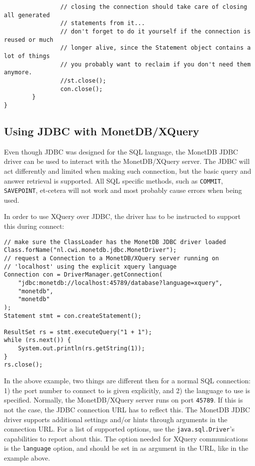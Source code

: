 \documentclass{article}
\begin{document}
\begin{verbatim}
                // closing the connection should take care of closing all generated
                // statements from it...
                // don't forget to do it yourself if the connection is reused or much
                // longer alive, since the Statement object contains a lot of things
                // you probably want to reclaim if you don't need them anymore.
                //st.close();
                con.close();
        }
}
\end{verbatim}

\subsection{Using JDBC with MonetDB/XQuery}
Even though JDBC was designed for the SQL language, the MonetDB JDBC
driver can be used to interact with the MonetDB/XQuery server.  The JDBC
will act differently and limited when making such connection, but the
basic query and answer retrieval is supported.  All SQL specific
methods, such as \texttt{COMMIT}, \texttt{SAVEPOINT}, et-cetera will not
work and most probably cause errors when being used.

In order to use XQuery over JDBC, the driver has to be instructed to
support this during connect:
\begin{verbatim}
// make sure the ClassLoader has the MonetDB JDBC driver loaded
Class.forName("nl.cwi.monetdb.jdbc.MonetDriver");
// request a Connection to a MonetDB/XQuery server running on
// 'localhost' using the explicit xquery language
Connection con = DriverManager.getConnection(
    "jdbc:monetdb://localhost:45789/database?language=xquery",
    "monetdb",
    "monetdb"
);
Statement stmt = con.createStatement();

ResultSet rs = stmt.executeQuery("1 + 1");
while (rs.next()) {
    System.out.println(rs.getString(1));
}
rs.close();
\end{verbatim}
In the above example, two things are different then for a normal SQL
connection: 1) the port number to connect to is given explicitly, and 2)
the language to use is specified.  Normally, the MonetDB/XQuery server
runs on port \texttt{45789}.  If this is not the case, the JDBC
connection URL has to reflect this.  The MonetDB JDBC driver supports
additional settings and/or hints through arguments in the connection
URL.  For a list of supported options, use the
\texttt{java.sql.Driver}'s capabilities to report about this.  The
option needed for XQuery communications is the \texttt{language} option,
and should be set in as argument in the URL, like in the example above.
\end{document}
